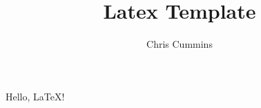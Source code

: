 \documentclass{article}
\title{Latex Template}
\author{Chris Cummins}
\begin{document}
\maketitle
Hello, \LaTeX!
\end{document}
